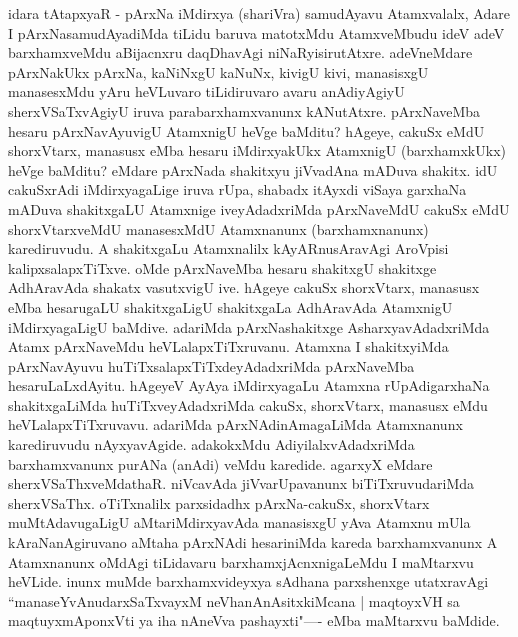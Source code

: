 \begin{artha}
idara tAtapxyaR - pArxNa iMdirxya (shariVra) samudAyavu Atamxvalalx, Adare I pArxNasamudAyadiMda tiLidu baruva matotxMdu AtamxveMbudu ideV adeV barxhamxveMdu aBijacnxru daqDhavAgi niNaRyisirutAtxre. adeVneMdare pArxNakUkx pArxNa, kaNiNxgU kaNuNx, kivigU kivi, manasisxgU manasesxMdu yAru heVLuvaro tiLidiruvaro avaru anAdiyAgiyU sherxVSaTxvAgiyU iruva  parabarxhamxvanunx kANutAtxre. pArxNaveMba hesaru pArxNavAyuvigU AtamxnigU heVge baMditu? hAgeye, cakuSx eMdU shorxVtarx, manasusx eMba hesaru iMdirxyakUkx AtamxnigU (barxhamxkUkx) heVge baMditu? eMdare pArxNada shakitxyu jiVvadAna mADuva shakitx. idU cakuSxrAdi iMdirxyagaLige iruva rUpa, shabadx itAyxdi viSaya garxhaNa mADuva shakitxgaLU Atamxnige iveyAdadxriMda pArxNaveMdU cakuSx eMdU shorxVtarxveMdU manasesxMdU Atamxnanunx (barxhamxnanunx) karediruvudu. A shakitxgaLu Atamxnalilx kAyARnusAravAgi AroVpisi kalipxsalapxTiTxve. oMde pArxNaveMba hesaru shakitxgU shakitxge AdhAravAda shakatx vasutxvigU ive. hAgeye cakuSx shorxVtarx, manasusx eMba hesarugaLU shakitxgaLigU shakitxgaLa AdhAravAda AtamxnigU iMdirxyagaLigU baMdive. adariMda pArxNashakitxge AsharxyavAdadxriMda Atamx pArxNaveMdu heVLalapxTiTxruvanu. Atamxna I shakitxyiMda pArxNavAyuvu huTiTxsalapxTiTxdeyAdadxriMda pArxNaveMba hesaruLaLxdAyitu. hAgeyeV AyAya iMdirxyagaLu Atamxna rUpAdigarxhaNa shakitxgaLiMda huTiTxveyAdadxriMda cakuSx, shorxVtarx, manasusx eMdu heVLalapxTiTxruvavu. adariMda pArxNAdinAmagaLiMda Atamxnanunx karediruvudu nAyxyavAgide. adakokxMdu AdiyilalxvAdadxriMda barxhamxvanunx purANa (anAdi) veMdu karedide. agarxyX eMdare sherxVSaThxveMdathaR. niVcavAda jiVvarUpavanunx biTiTxruvudariMda sherxVSaThx. oTiTxnalilx parxsidadhx pArxNa-cakuSx, shorxVtarx muMtAdavugaLigU aMtariMdirxyavAda manasisxgU yAva Atamxnu mUla kAraNanAgiruvano aMtaha pArxNAdi hesariniMda kareda barxhamxvanunx A Atamxnanunx oMdAgi tiLidavaru barxhamxjAcnxnigaLeMdu I maMtarxvu heVLide. inunx muMde barxhamxvideyxya sAdhana parxshenxge utatxravAgi ``manaseYvAnudarxSaTxvayxM neVhanAnAsitxkiMcana | maqtoyxVH sa maqtuyxmAponxVti ya iha nAneVva pashayxti"---- eMba maMtarxvu baMdide.
\end{artha}



